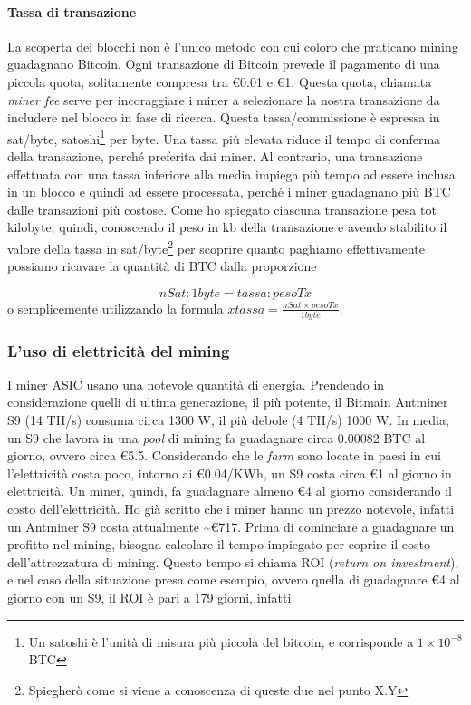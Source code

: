 \documentclass {article}
\begin{document}
\paragraph {Tassa di transazione}

La scoperta dei blocchi non è l'unico metodo con cui coloro che praticano mining guadagnano Bitcoin.
Ogni transazione di Bitcoin prevede il pagamento di una piccola quota, solitamente compresa tra \euro{0.01} e \euro{1}.
Questa quota, chiamata \textit{miner fee} serve per incoraggiare i miner a selezionare la nostra transazione da includere nel blocco in fase di ricerca.
Questa tassa/commissione è espressa in sat/byte, satoshi\footnote{Un satoshi è l'unità di misura più piccola del bitcoin, e corrisponde a $1 \times 10^{-8}$ BTC} per byte.
Una tassa più elevata riduce il tempo di conferma della transazione, perché preferita dai miner. Al contrario, una transazione effettuata con una tassa inferiore alla media impiega più tempo ad essere inclusa in un blocco e quindi ad essere processata, perché i miner guadagnano più BTC dalle transazioni più costose.
Come ho spiegato ciascuna transazione pesa tot kilobyte, quindi, conoscendo il peso in kb della transazione e avendo stabilito il valore della tassa in sat/byte\footnote{Spiegherò come si viene a conoscenza di queste due nel punto X.Y} per scoprire quanto paghiamo effettivamente possiamo ricavare la quantità di BTC dalla proporzione

$$ nSat : 1 byte = tassa : pesoTx $$
%
o semplicemente utilizzando la formula $x tassa = \frac{nSat \times pesoTx}{1 byte}$.


\subsubsection {L'uso di elettricità del mining}


I miner ASIC usano una notevole quantità di energia. Prendendo in considerazione quelli di ultima generazione, il più potente, il Bitmain Antminer S9 (14 TH/s) consuma circa 1300 W, il più debole (4 TH/s) 1000 W.
In media, un S9 che lavora in una \textit{pool} di mining fa guadagnare circa 0.00082 BTC al giorno, ovvero circa \euro{5.5}.
Considerando che le \textit{farm} sono locate in paesi in cui l'elettricità costa poco, intorno ai \euro{0.04}/KWh, un S9 costa circa \euro{1} al giorno in elettricità.
Un miner, quindi, fa guadagnare almeno \euro{4} al giorno considerando il costo dell'elettricità.
Ho già scritto che i miner hanno un prezzo notevole, infatti un Antminer S9 costa attualmente \textasciitilde \euro{717}.
Prima di cominciare a guadagnare un profitto nel mining, bisogna calcolare il tempo impiegato per coprire il costo dell'attrezzatura di mining.
Questo tempo si chiama ROI (\textit{return on investment}), e nel caso della situazione presa come esempio, ovvero quella di guadagnare \euro{4} al giorno con un S9, il ROI è pari a 179 giorni, infatti
\end{document}
